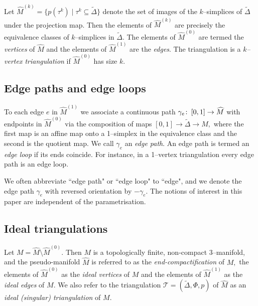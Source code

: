 \documentclass[a4paper]{gtart}
\def\tri{\mathcal{T}}
\def\manifold{M}
\theoremstyle{plain}
\theoremstyle{definition}
\theoremstyle{remark}
\numberwithin{equation}{section}
\begin{document}
Let $\widehat{\manifold}^{(k)}= \{ p(\tau^k) \mid \tau^k \subseteq \widetilde{\Delta}\}$ denote the set of images of the $k$--simplices 
of $\widetilde{\Delta}$ under the projection map. Then the elements of $\widehat{\manifold}^{(k)}$ are precisely the equivalence classes of $k$--simplices in $\widetilde{\Delta}.$
The elements of $\widehat{\manifold}^{(0)}$ are termed the \emph{vertices} of $\widehat{\manifold}$ and the elements of $\widehat{\manifold}^{(1)}$ are the \emph{edges}. 
The triangulation is a \emph{$k$--vertex triangulation} if $\widehat{\manifold}^{(0)}$ has size $k.$ 


\subsection{Edge paths and edge loops}
\label{sec:Edge paths and edge loops}

To each edge $e$ in $\widehat{\manifold}^{(1)}$ we associate a continuous path $\gamma_e \co [0,1]\to \widehat{\manifold}$ with endpoints in $\widehat{\manifold}^{(0)}$ via the composition of maps $[0,1] \to \widetilde{\Delta} \to \widehat{\manifold},$ where the first map is an affine map onto a 1--simplex in the equivalence class and the second is the quotient map. We call $\gamma_e$ an \emph{edge path}. An edge path is termed an \emph{edge loop} if its ends coincide. For instance, in a 1--vertex triangulation every edge path is an edge loop.

We often abbreviate ``edge path" or ``edge loop" to ``edge", and we denote the edge path $\gamma_e$ with reversed orientation by $-\gamma_e.$ The notions of interest in this paper are independent of the parametrisation.


\subsection{Ideal triangulations}
\label{sec:Ideal triangulations}

Let $\manifold = \widehat{\manifold}\setminus \widehat{\manifold}^{(0)}.$ Then $\manifold$ is a topologically finite, non-compact 3--manifold, and the pseudo-manifold $\widehat{\manifold}$ is referred to as the \emph{end-compactification} of $\manifold ,$ the elements of $\widehat{\manifold}^{(0)}$ as the \emph{ideal vertices} of $\manifold$ and the elements of $\widehat{\manifold}^{(1)}$ as the \emph{ideal edges} of $\manifold .$ 
We also refer to the triangulation $\tri = ( \widetilde{\Delta}, \Phi, p)$ of $\widehat{\manifold}$ as an \emph{ideal (singular) triangulation} of $\manifold .$
\end{document}
